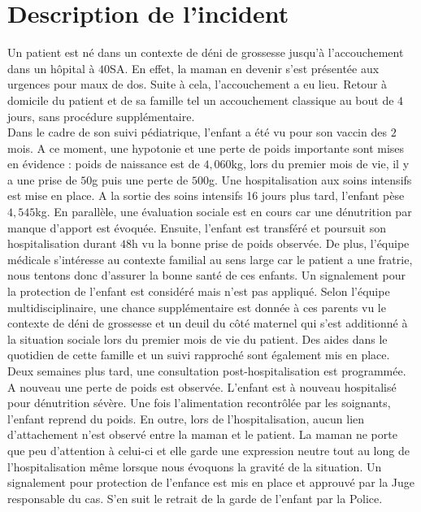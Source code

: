 \section{Description de l'incident}

Un patient est né dans un contexte de déni de grossesse jusqu’à l’accouchement dans un hôpital à $40$SA. En effet, la maman en devenir s’est présentée aux urgences pour maux de dos. Suite à cela, l’accouchement a eu lieu. Retour à domicile du patient et de sa famille tel un accouchement classique au bout de $4$ jours, sans procédure supplémentaire.\\ 

Dans le cadre de son suivi pédiatrique, l’enfant a été vu pour son vaccin des $2$ mois. A ce moment, une hypotonie et une perte de poids importante sont mises en évidence : poids de naissance est de $4,060$kg, lors du premier mois de vie, il y a une prise de $50$g puis une perte de $500$g. Une hospitalisation aux soins intensifs est mise en place. A la sortie des soins intensifs 16 jours plus tard, l’enfant pèse $4,545$kg. En parallèle, une évaluation sociale est en cours car une dénutrition par manque d’apport est évoquée. Ensuite, l’enfant est transféré et poursuit son hospitalisation durant $48$h vu la bonne prise de poids observée. De plus, l’équipe médicale s’intéresse au contexte familial au sens large car le patient a une fratrie, nous tentons donc d’assurer la bonne santé de ces enfants. Un signalement pour la protection de l’enfant est considéré mais n’est pas appliqué. Selon l’équipe multidisciplinaire, une chance supplémentaire est donnée à ces parents vu le contexte de déni de grossesse et un deuil du côté maternel qui s’est additionné à la situation sociale lors du premier mois de vie du patient. Des aides dans le quotidien de cette famille et un suivi rapproché sont également mis en place.\\

Deux semaines plus tard, une consultation post-hospitalisation est programmée. A nouveau une perte de poids est observée. L’enfant est à nouveau hospitalisé pour dénutrition sévère. Une fois l’alimentation recontrôlée par les soignants, l’enfant reprend du poids. En outre, lors de l’hospitalisation, aucun lien d’attachement n’est observé entre la maman et le patient. La maman ne porte que peu d’attention à celui-ci et elle garde une expression neutre tout au long de l’hospitalisation même lorsque nous évoquons la gravité de la situation. Un signalement pour protection de l’enfance est mis en place et approuvé par la Juge responsable du cas. S’en suit le retrait de la garde de l’enfant par la Police.\\

